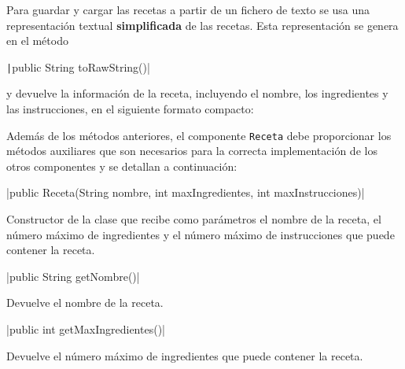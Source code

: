 \documentclass[
    a4paper, %
    12pt, %
]{CSSullivanBusinessReport}
\begin{document}

Para guardar y cargar las recetas a partir de un fichero de texto se usa una representación textual \textbf{simplificada} de las recetas. Esta representación se genera en el método

\texttt|public String toRawString()|

y devuelve la información de la receta, incluyendo el nombre, los ingredientes y las instrucciones, en el siguiente formato compacto:


Además de los métodos anteriores, el componente \texttt{Receta} debe proporcionar los métodos auxiliares que son necesarios para la correcta implementación de los otros componentes y se detallan a continuación:

|public Receta(String nombre, int maxIngredientes, int maxInstrucciones)|

Constructor de la clase que recibe como parámetros el nombre de la receta, el número máximo de ingredientes y el número máximo de instrucciones que puede contener la receta.

|public String getNombre()|

Devuelve el nombre de la receta.

|public int getMaxIngredientes()|

Devuelve el número máximo de ingredientes que puede contener la receta.
\end{document}
